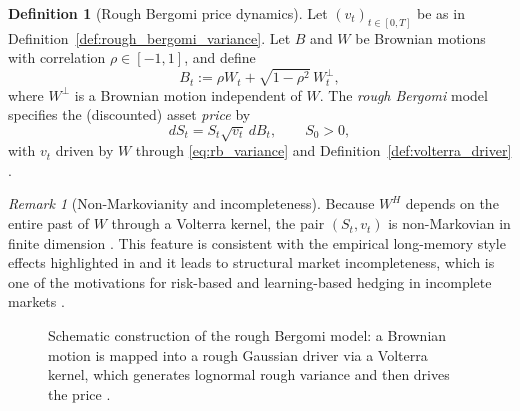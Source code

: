 \documentclass[12pt,a4paper]{article}
\theoremstyle{definition}
\newtheorem{definition}{Definition}[section]
\theoremstyle{plain}
\theoremstyle{remark}
\newtheorem{remark}{Remark}[section]
\theoremstyle{plain}
\begin{document}
\begin{definition}[Rough Bergomi price dynamics]
\label{def:rough_bergomi_price}
Let $(v_t)_{t\in[0,T]}$ be as in Definition~\ref{def:rough_bergomi_variance}. 
Let $B$ and $W$ be Brownian motions with correlation $\rho\in[-1,1]$, and define
\[
    B_t := \rho W_t + \sqrt{1-\rho^2}\,W_t^\perp,
\]
where $W^\perp$ is a Brownian motion independent of $W$. 
The \emph{rough Bergomi} model specifies the (discounted) asset \emph{price} by
\[
    dS_t = S_t \sqrt{v_t}\, dB_t,
    \qquad S_0>0,
\]
with $v_t$ driven by $W$ through \eqref{eq:rb_variance} and Definition~\ref{def:volterra_driver} \cite{BayerFriz2016}.
\end{definition}

\begin{remark}[Non-Markovianity and incompleteness]
\label{rem:non_markov_incomplete}
Because $W^H$ depends on the entire past of $W$ through a Volterra kernel, the pair $(S_t,v_t)$ is non-Markovian in finite dimension \cite{BayerFriz2016}. 
This feature is consistent with the empirical long-memory style effects highlighted in \cite{GatheralRough} and it leads to structural market incompleteness, which is one of the motivations for risk-based and learning-based hedging in incomplete markets \cite{Buehler2019DeepHedging,Horvath2021DeepRough}.
\end{remark}

\begin{figure}[H]
\centering
{}
\caption{Schematic construction of the rough Bergomi model: a Brownian motion is mapped into a rough Gaussian driver via a Volterra kernel, which generates lognormal rough variance and then drives the price \cite{BayerFriz2016,GatheralRough}.}
\label{fig:rbm_schematic}
\end{figure}
\FloatBarrier
\end{document}
